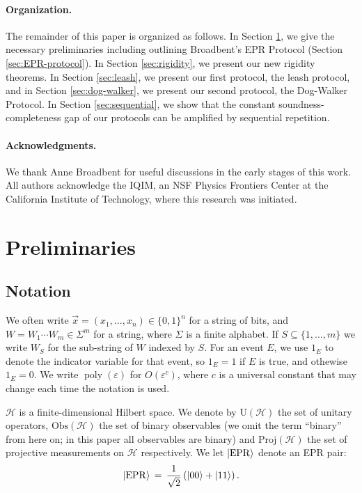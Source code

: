 \documentclass[11pt,letter]{article}
\theoremstyle{remark}
\theoremstyle{definition}
\newcommand{\ket}[1]{|#1\rangle}
\newcommand{\setft}[1]{\mathrm{#1}}
\newcommand{\Proj}{\setft{Proj}}
\newcommand{\Obs}{\setft{Obs}}
\newcommand{\Unitary}{\setft{U}}
\DeclareMathOperator{\poly}{poly}
\newcommand{\mH}{\mathcal{H}}
\newcommand{\eps}{\varepsilon}
\newcommand{\EPR}{{\rm EPR}}
\begin{document}
\paragraph{Organization.} The remainder of this paper is organized as follows. In Section \ref{sec:prelim}, we give the necessary preliminaries including outlining Broadbent's EPR Protocol (Section \ref{sec:EPR-protocol}). In Section \ref{sec:rigidity}, we present our new rigidity theorems. In Section \ref{sec:leash}, we present our first protocol, the leash protocol, and in Section \ref{sec:dog-walker}, we present our second protocol, the Dog-Walker Protocol. In Section \ref{sec:sequential}, we show that the constant soundness-completeness gap of our protocols can be amplified by sequential repetition.


\paragraph{Acknowledgments.} We thank Anne Broadbent for useful discussions in the early stages of this work. All authors acknowledge the IQIM, an NSF Physics Frontiers Center at the California Institute of Technology, where this research was initiated. 

\section{Preliminaries}\label{sec:prelim}


\subsection{Notation}
\label{sec:prelim-notation}

We often write $\vec{x} =(x_1,\ldots,x_n)\in \{0,1\}^n$ for a string of bits, and $W=W_1\cdots W_m\in\Sigma^m$ for a string, where $\Sigma$ is a finite alphabet. If $S\subseteq \{1,\ldots,m\}$ we write $W_S$ for the sub-string of $W$ indexed by $S$. For an event $E$, we use $1_{E}$ to denote the indicator variable for that event, so $1_E=1$ if $E$ is true, and othewise $1_E=0$. We write $\poly(\eps)$ for $O(\eps^c)$, where $c$ is a universal constant that may change each time the notation is used. 

$\mH$ is a finite-dimensional Hilbert space.  We denote by $\Unitary(\mH)$ the set of unitary operators, $\Obs(\mH)$ the set of binary observables (we omit the term ``binary'' from here on; in this paper all observables are binary) and $\Proj(\mH)$ the set of projective measurements on $\mH$ respectively.  
We let $\ket{\EPR}$ denote an EPR pair: 
$$\ket{\EPR}\,=\,\frac{1}{\sqrt{2}}\left(\ket{00}+\ket{11}\right).$$
\end{document}
